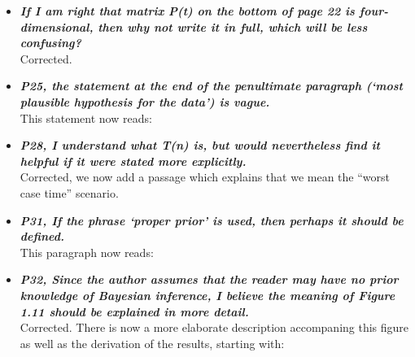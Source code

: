 \documentclass[english]{article}
\begin{document}
\begin{itemize}
\item {
{\it
\textbf{
If I am right that matrix P(t) on the bottom of page 22 is four-dimensional, then why not write it in full, which will be less confusing?
}%
}%
}%
\\
Corrected.




\item {
{\it
\textbf{
P25, the statement at the end of the penultimate paragraph (`most plausible hypothesis for the data') is vague.
}%
}%
}%
\\
This statement now reads:

\begin{quote}
\myeditsveight
\end{quote}



\item {
{\it
\textbf{
P28, I understand what T(n) is, but would nevertheless find it helpful if it were stated more explicitly.
}%
}%
}%
\\
Corrected, we now add a passage which explains that we mean the ``worst case time'' scenario.


\item {
{\it
\textbf{
P31, If the phrase `proper prior' is used, then perhaps it should be defined.
}%
}%
}%
\\
This paragraph now reads:

\begin{quote}
\myeditsvnine
\end{quote}


\item {
{\it
\textbf{
P32, Since the author assumes that the reader may have no prior knowledge of Bayesian inference, I believe the meaning of Figure 1.11 should be explained in more detail.
}%
}%
}%
\\
Corrected. There is now a more elaborate description accompaning this figure as well as the derivation of the results, starting with:


\end{itemize}
\end{document}
